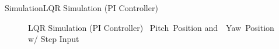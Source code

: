 \documentclass{beamer}
\begin{document}
\begin{frame}{Simulation}{LQR Simulation (PI Controller)}
    \begin{figure}
      \centering
      \caption{LQR Simulation (PI Controller) ~Pitch~Position and~~Yaw~Position w/ Step Input}
      \label{fig:LQR_PI_Sim_pos}
    \end{figure}
\end{frame}
\end{document}
